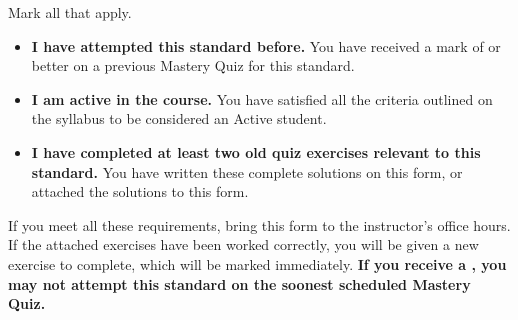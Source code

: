 \documentclass[12pt]{article}
\newcommand{\issuesMark}{{\fontencoding{U}\fontfamily{futs}\selectfont\char 66\relax}}
\begin{document}

\vspace{1em}



\renewcommand\labelitemi{\(\square\)}
Mark all that apply.
\begin{itemize}
  \item \textbf{I have attempted this standard before.}
        You have received a mark of \issuesMark{} or better on a previous Mastery Quiz
        for this standard.
  \item \textbf{I am active in the course.}
        You have satisfied all the criteria outlined on the syllabus to be
        considered an Active student.
  \item \textbf{I have completed at least two old quiz exercises
        relevant to this standard.}
        You have written these complete solutions on this form, or attached the solutions
        to this form.
\end{itemize}

If you meet all these requirements,
bring this form to the instructor's office hours. 
If the attached exercises have been worked correctly, you will be given
a new exercise to complete, which will be marked immediately.
\textbf{If you
receive a \checkmark{}, you may not attempt this standard on the
soonest scheduled Mastery Quiz.}
\end{document}
